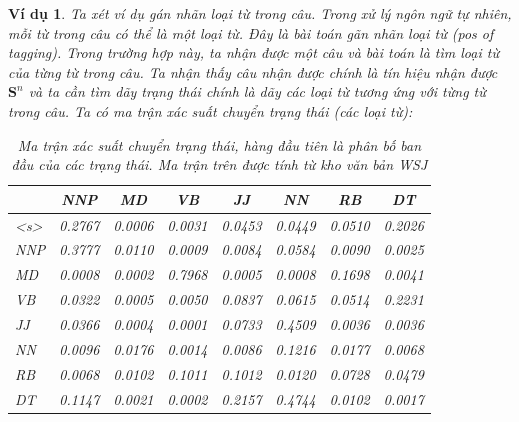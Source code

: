 \documentclass[14pt, a4paper]{article}
\numberwithin{equation}{section}
\numberwithin{figure}{section}
\theoremstyle{sltheorem}
\newtheorem{vd}{Ví dụ}
\theoremstyle{soltheorem}
\numberwithin{dl}{section}
\numberwithin{md}{section}
\numberwithin{vd}{section}
\begin{document}
    \begin{vd}
        Ta xét ví dụ gán nhãn loại từ trong câu.
        Trong xử lý ngôn ngữ tự nhiên, mỗi từ trong câu có thể là một loại từ.
        Đây là bài toán gãn nhãn loại từ (pos of tagging).
        Trong trường hợp này, ta nhận được một câu và bài toán là tìm loại từ của từng từ trong câu.
        Ta nhận thấy câu nhận được chính là tín hiệu nhận được $\mathbf{S}^n$ và ta cần tìm dãy trạng thái chính là dãy các loại từ tương ứng với từng từ trong câu.
        Ta có ma trận xác suất chuyển trạng thái (các loại từ):

        \begin{table}[h!]
            \begin{center}
                \begin{tabular}{| l | c | c | c | c | c | c | c |}
                    \hline
                    & NNP & MD & VB & JJ & NN & RB & DT \\
                    \hline
                    <s> & 0.2767 & 0.0006 & 0.0031 & 0.0453 & 0.0449 & 0.0510 & 0.2026 \\
                    \hline
                    NNP & 0.3777 & 0.0110 & 0.0009 & 0.0084 & 0.0584 & 0.0090 & 0.0025 \\
                    \hline
                    MD & 0.0008 & 0.0002 & 0.7968 & 0.0005 & 0.0008 & 0.1698 & 0.0041 \\
                    \hline
                    VB & 0.0322 & 0.0005 & 0.0050 & 0.0837 & 0.0615 & 0.0514 & 0.2231 \\
                    \hline
                    JJ & 0.0366 & 0.0004 & 0.0001 & 0.0733 & 0.4509 & 0.0036 & 0.0036 \\
                    \hline
                    NN & 0.0096 & 0.0176 & 0.0014 & 0.0086 & 0.1216 & 0.0177 & 0.0068 \\
                    \hline
                    RB & 0.0068 & 0.0102 & 0.1011 & 0.1012 & 0.0120 & 0.0728 & 0.0479 \\
                    \hline
                    DT & 0.1147 & 0.0021 & 0.0002 & 0.2157 & 0.4744 & 0.0102 & 0.0017 \\
                    \hline
                \end{tabular}
            \end{center}
            \caption{Ma trận xác suất chuyển trạng thái, hàng đầu tiên là phân bố ban đầu của các trạng thái. Ma trận trên được tính từ kho văn bản WSJ}
        \end{table}


\end{vd}
\end{document}
